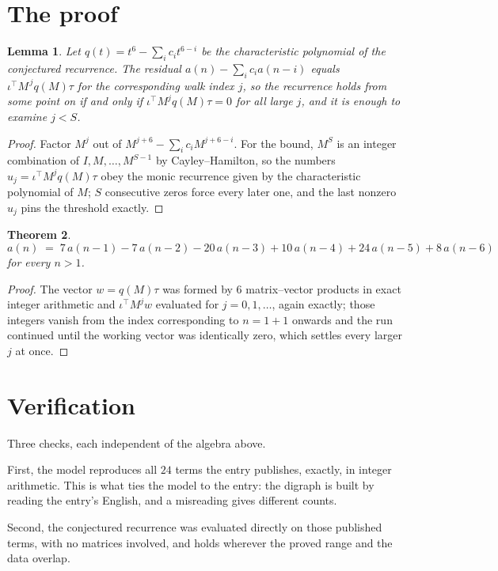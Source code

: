 \documentclass[11pt,a4paper]{article}
\theoremstyle{plain}
\newtheorem{theorem}{Theorem}
\newtheorem{lemma}[theorem]{Lemma}
\theoremstyle{definition}
\begin{document}
\section{The proof}

\begin{lemma}\label{lem:crit}
Let $q(t)=t^{6}-\sum_i c_it^{6-i}$ be the characteristic polynomial of the
conjectured recurrence. The residual $a(n)-\sum_ic_ia(n-i)$ equals
$\iota^{\!\top}M^{\,j}q(M)\tau$ for the corresponding walk index $j$, so the recurrence
holds from some point on if and only if $\iota^{\!\top}M^{j}q(M)\tau=0$ for all large $j$,
and it is enough to examine $j<S$.
\end{lemma}

\begin{proof}
Factor $M^{j}$ out of $M^{j+6}-\sum_ic_iM^{j+6-i}$. For the bound, $M^{S}$
is an integer combination of $I,M,\dots,M^{S-1}$ by Cayley--Hamilton, so the numbers
$u_j=\iota^{\!\top}M^{j}q(M)\tau$ obey the monic recurrence given by the characteristic
polynomial of $M$; $S$ consecutive zeros force every later one, and the last nonzero $u_j$
pins the threshold exactly.
\end{proof}

\begin{theorem}
\[
a(n)\;=\;7\,a(n-1) - 7\,a(n-2) - 20\,a(n-3) + 10\,a(n-4) + 24\,a(n-5) + 8\,a(n-6)
\]
for every $n>1$.
\end{theorem}

\begin{proof}
The vector $w=q(M)\tau$ was formed by $6$ matrix--vector products in exact integer
arithmetic and $\iota^{\!\top}M^{j}w$ evaluated for $j=0,1,\dots$, again exactly; those
integers vanish from the index corresponding to $n=1+1$ onwards and the run continued
until the working vector was identically zero, which settles every larger $j$ at once.
\end{proof}

\section{Verification}

Three checks, each independent of the algebra above.

First, the model reproduces all $24$ terms the entry publishes, exactly, in integer
arithmetic. This is what ties the model to the entry: the digraph is built by reading the
entry's English, and a misreading gives different counts.

Second, the conjectured recurrence was evaluated directly on those published terms, with no
matrices involved, and holds wherever the proved range and the data overlap.
\end{document}
